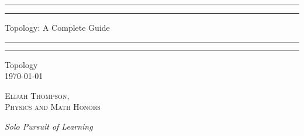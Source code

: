 \documentclass[12pt, a4paper, oneside, openright, titlepage]{book}
\begin{document}

\begin{titlepage}
    \centering
    \scshape
    \vspace*{\baselineskip}
    \rule{\textwidth}{1.6pt}\vspace*{-\baselineskip}\vspace*{2pt}
    \rule{\textwidth}{0.4pt}
    
    \vspace{0.75\baselineskip}
    
    {\LARGE Topology: A Complete Guide}
    
    \vspace{0.75\baselineskip}
    
    \rule{\textwidth}{0.4pt}\vspace*{-\baselineskip}\vspace{3.2pt}
    \rule{\textwidth}{1.6pt}
    
    \vspace{2\baselineskip}
    Topology \\
    \vspace*{3\baselineskip}
    \monthdayyeardate\today \\
    \vspace*{5.0\baselineskip}
    
    {\scshape\Large Elijah Thompson, \\ Physics and Math Honors\\}
    
    \vspace{1.0\baselineskip}
    \textit{Solo Pursuit of Learning}
    \vfill
    \enlargethispage{1in}
    \begin{figure}[b!]
    \end{figure}
\end{titlepage}
\end{document}
